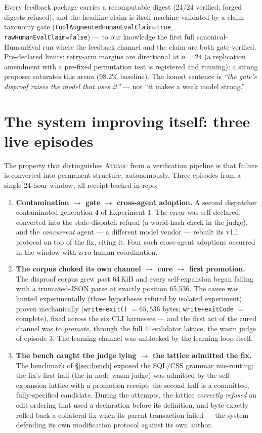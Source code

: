 Every feedback package carries a recomputable digest (24/24 verified; forged
digests refused), and the headline claim is itself machine-validated by a claim
taxonomy gate (\texttt{toolAugmentedHumanEvalClaim=true},
\texttt{rawHumanEvalClaim=false}) --- to our knowledge the first full
canonical-HumanEval run where the feedback channel and the claim are both
gate-verified. Pre-declared limits: retry-arm margins are directional at
$n{=}24$ (a replication amendment with a pre-fixed permutation test is registered
and running); a strong proposer saturates this arena (98.2\% baseline). The
honest sentence is \emph{``the gate's disproof raises the model that uses it''}
--- not ``it makes a weak model strong.''

\section{The system improving itself: three live episodes}\label{sec:cases}

The property that distinguishes \textsc{Atomic} from a verification pipeline is
that failure is converted into permanent structure, autonomously. Three episodes
from a single 24-hour window, all receipt-backed in-repo:

\begin{enumerate}
\item \textbf{Contamination $\to$ gate $\to$ cross-agent adoption.} A second
  dispatcher contaminated generation 4 of Experiment 1. The error was
  self-declared, converted into the stale-dispatch refusal (a world-hash check
  in the judge), and the \emph{concurrent} agent --- a different model vendor ---
  rebuilt its v1.1 protocol on top of the fix, citing it. Four such cross-agent
  adoptions occurred in the window with zero human coordination.
\item \textbf{The corpus choked its own channel $\to$ cure $\to$ first
  promotion.} The disproof corpus grew past 64\,KiB and every self-expansion
  began failing with a truncated-JSON parse at exactly position 65{,}536. The
  cause was hunted experimentally (three hypotheses refuted by isolated
  experiment), proven mechanically
  (\texttt{write+exit()} $=65{,}536$ bytes; \texttt{write+exitCode} $=$
  complete), fixed across the six CLI harnesses --- and the first act of the
  cured channel was to \emph{promote}, through the full 41-validator lattice,
  the wasm judge of episode 3. The learning channel was unblocked by the
  learning loop itself.
\item \textbf{The bench caught the judge lying $\to$ the lattice admitted the
  fix.} The benchmark of \S\ref{sec:bench} exposed the SQL/CSS grammar
  mis-routing; the fix's first half (the in-node wasm judge) was admitted by the
  self-expansion lattice with a promotion receipt; the second half is a
  committed, fully-specified candidate. During the attempts, the lattice
  \emph{correctly refused} an edit ordering that used a declaration before its
  definition, and byte-exactly rolled back a collateral fix when its parent
  transaction failed --- the system defending its own modification protocol
  against its own author.
\end{enumerate}

